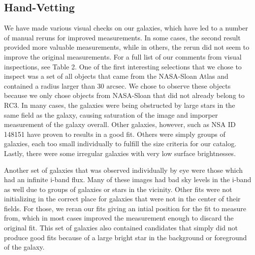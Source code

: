 \documentclass[12pt,preprint,pdftex]{aastex}
\newcommand{\units}[1]{\mathrm{#1}}
\renewcommand{\arcsec}{\units{arcsec}}
\begin{document}
\subsection{Hand-Vetting}
We have made various visual checks on our galaxies, which have led to
a number of manual reruns for improved measurements. In some cases,
the second result provided more valuable measurements, while in
others, the rerun did not seem to improve the original
measurements. For a full list of our comments from visual inspections,
see Table 2. One of the first interesting selections that we chose to
inspect was a set of all objects that came from the NASA-Sloan Atlas
and contained a radius larger than 30 $\arcsec$. We chose to observe
these objects because we only chose objects from NASA-Sloan that did
not already belong to RC3. In many cases, the galaxies were being
obstructed by large stars in the same field as the galaxy, causing
saturation of the image and imporper measurement of the galaxy
overall. Other galaxies, however, such as NSA ID 148151 have proven to
results in a good fit. Others were simply groups of galaxies, each too
small individually to fulfill the size criteria for our
catalog. Lastly, there were some irregular galaxies with very low
surface brightnesses.


Another set of galaxies that was observed individually by eye were
those which had an infinite i-band flux. Many of these images had bad
sky levels in the i-band as well due to groups of galaxies or stars in
the vicinity. Other fits were not initializing in the correct place
for galaxies that were not in the center of their fields. For those,
we reran our fits giving an intial position for the fit to measure
from, which in most cases improved the measurement enough to discard
the original fit. This set of galaxies also contained candidates that
simply did not produce good fits because of a large bright star in the
background or foreground of the galaxy.
\end{document}
